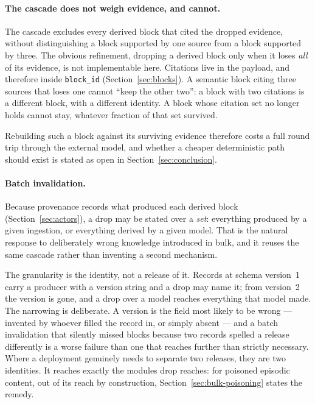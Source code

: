 \documentclass[11pt,a4paper]{article}
\begin{document}
\paragraph{The cascade does not weigh evidence, and cannot.}
The cascade excludes every derived block that cited the dropped evidence, without
distinguishing a block supported by one source from a block supported by three.
The obvious refinement, dropping a derived block only when it loses \emph{all}
of its evidence, is not implementable here. Citations live in the payload, and therefore inside \texttt{block\_id}
(Section~\ref{sec:blocks}). A semantic block citing three sources that loses one
cannot ``keep the other two'': a block with two citations is a different block,
with a different identity. A block whose citation set no longer holds cannot
stay, whatever fraction of that set survived.

Rebuilding such a block against its surviving evidence therefore costs a full
round trip through the external model, and whether a cheaper deterministic
path should exist is stated as open in Section~\ref{sec:conclusion}.

\paragraph{Batch invalidation.}
Because provenance records what produced each derived block
(Section~\ref{sec:actors}), a drop may be stated over a \emph{set}: everything
produced by a given ingestion, or everything derived by a given model. That is
the natural response to deliberately wrong knowledge introduced in bulk, and it
reuses the same cascade rather than inventing a second mechanism.

The granularity is the identity, not a release of it. Records at schema
version~1 carry a producer with a version string and a drop may name it;
from version~2 the version is gone, and a drop over a model reaches everything
that model made. The narrowing is deliberate. A version is the field most
likely to be wrong --- invented by whoever filled the record in, or simply
absent --- and a batch invalidation that silently missed blocks because two
records spelled a release differently is a worse failure than one that reaches
further than strictly necessary. Where a deployment genuinely needs to separate
two releases, they are two identities.
It reaches exactly the modules drop reaches: for poisoned episodic content,
out of its reach by construction, Section~\ref{sec:bulk-poisoning} states the
remedy.
\end{document}
